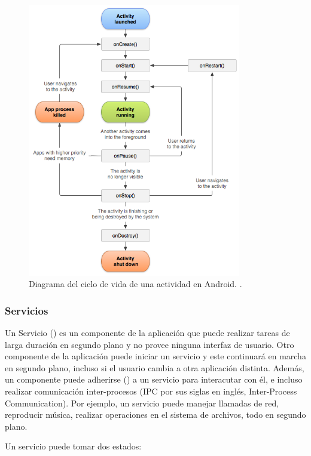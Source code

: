 \begin{figure}[h] \centering
    \includegraphics[height=12cm]{graphs/activity_lifecycle.png} \caption{Diagrama del ciclo de vida de una actividad en Android. \cite{androiddevguide}.}\label{fig:diagrama:ActivityLifecycle}
\end{figure}

\subsubsection{Servicios}
\label{ssec:teo:svc}

Un Servicio () es un componente de la aplicación que puede realizar tareas de larga duración en segundo plano y no provee ninguna interfaz de usuario. Otro componente de la aplicación puede iniciar un servicio y este continuará en marcha en segundo plano, incluso si el usuario cambia a otra aplicación distinta. Además, un componente puede adherirse () a un servicio para interacutar con él, e incluso realizar comunicación inter-procesos (IPC por sus siglas en inglés, Inter-Process Communication). Por ejemplo, un servicio puede manejar llamadas de red, reproducir música, realizar operaciones en el sistema de archivos, todo en segundo plano.

Un servicio puede tomar dos estados:

